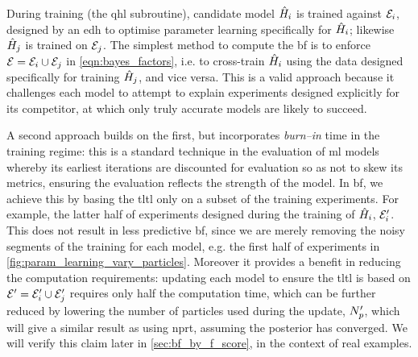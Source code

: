 During training (the \gls{qhl} subroutine), candidate model $\hat{H}_i$ is trained against ${ \mathcal{E} }_i$, 
    designed by an \gls{edh} to optimise parameter learning specifically for $\hat{H}_i$;
    likewise $\hat{H}_j$ is trained on ${ \mathcal{E} }_j$. 
The simplest method to compute the \gls{bf} is to enforce ${ \mathcal{E} }={ \mathcal{E} }_i \cup { \mathcal{E} }_j$ 
    in \cref{eqn:bayes_factors}, i.e. to cross-train $\hat{H}_i$ using the data designed specifically for training $\hat{H}_j$, 
    and vice versa. 
This is a valid approach because it challenges each model to attempt to explain \glspl{experiment}
    designed explicitly for its competitor,   
    at which only truly accurate models are likely to succeed. 
\par 
A second approach builds on the first, but incorporates \emph{burn--in} time in the training regime:
    this is a standard technique in the evaluation of \gls{ml} models whereby its earliest iterations 
    are discounted for evaluation so as not to skew its metrics, 
    ensuring the evaluation reflects the strength of the model. 
In \gls{bf}, we achieve this by basing the \gls{tltl} only on a subset of the training \glspl{experiment}. 
For example, the latter half of \glspl{experiment} designed during the training of $\hat{H}_i$, ${ \mathcal{E} }_i^{\prime}$. 
This does not result in less predictive \gls{bf}, since we are merely removing the 
    noisy segments of the training for each model, e.g. the first half of \glspl{experiment} in \cref{fig:param_learning_vary_particles}. 
Moreover it provides a benefit in reducing the computation requirements: 
    updating each model to ensure the \gls{tltl} is based on ${ \mathcal{E} }^{\prime}={ \mathcal{E} }_i^{\prime} \cup { \mathcal{E} }_j^{\prime}$
    requires only half the computation time, 
    which can be further reduced by lowering the number of \glspl{particle} used during the update, $N_p^{\prime}$, 
    which will give a similar result as using \gls{nprt}, assuming the posterior has converged.
We will verify this claim later in \cref{sec:bf_by_f_score}, in the context of real examples.
\par 

